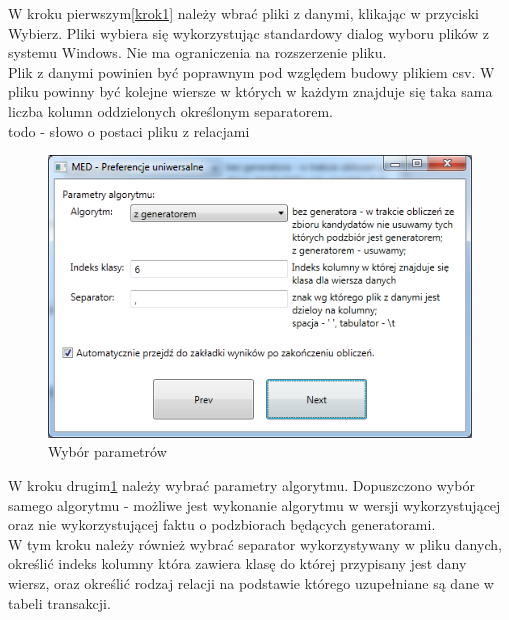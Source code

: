 \documentclass[a4paper,12pt]{article}
\begin{document}
W kroku pierwszym\ref{krok1} należy wbrać pliki z danymi, klikając w przyciski Wybierz. Pliki wybiera się wykorzystując standardowy dialog wyboru plików z systemu Windows. Nie ma ograniczenia na rozszerzenie pliku.\\

Plik z danymi powinien być poprawnym pod względem budowy plikiem csv. W pliku powinny być kolejne wiersze w których w każdym znajduje się taka sama liczba kolumn oddzielonych określonym separatorem.\\

todo - słowo o postaci pliku z relacjami\\

\begin{figure}[h!]
\begin{center}
\includegraphics[width=\textwidth]{img/2.png}
\caption{Wybór parametrów}
\label{krok2}
\end{center}
\end{figure}

W kroku drugim\ref{krok2} należy wybrać parametry algorytmu. Dopuszczono wybór samego algorytmu - możliwe jest wykonanie algorytmu w wersji wykorzystującej oraz nie wykorzystującej faktu o podzbiorach będących generatorami.\\

W tym kroku należy również wybrać separator wykorzystywany w pliku danych, określić indeks kolumny która zawiera klasę do której przypisany jest dany wiersz, oraz określić rodzaj relacji na podstawie którego uzupełniane są dane w tabeli transakcji.\\
\end{document}

